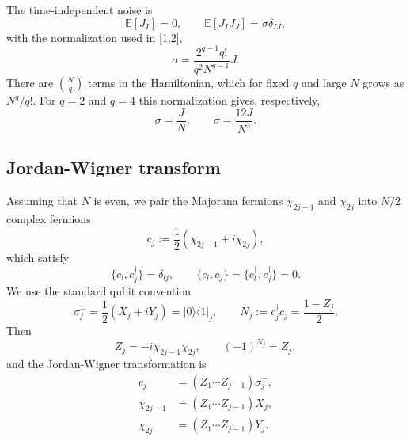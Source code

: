 \documentclass{article}
\theoremstyle{definition}
\begin{document}
The time-independent noise is
\begin{equation}
    \mathbb E[J_I]=0,
    \qquad
    \mathbb E[J_IJ_J]
    =
    \sigma\delta_{IJ},
\end{equation}
with the normalization used in [1,2],
\begin{equation}
    \sigma
    =
    \frac{2^{q-1}q!}{q^2N^{q-1}}J.
    \label{eq:SYK_sigma}
\end{equation}
There are $\binom Nq$ terms in the Hamiltonian, which for fixed $q$ and
large $N$ grows as $N^q/q!$.  For $q=2$ and $q=4$ this normalization
gives, respectively,
\begin{equation}
    \sigma=\frac{J}{N},
    \qquad
    \sigma=\frac{12J}{N^3}.
\end{equation}


\subsection{Jordan-Wigner transform}

Assuming that $N$ is even, we pair the Majorana fermions
$\chi_{2j-1}$ and $\chi_{2j}$ into $N/2$ complex fermions
\begin{equation}
    c_j
    :=
    \frac12
    \left(
       \chi_{2j-1}
       +
       i\chi_{2j}
    \right),
\end{equation}
which satisfy
\begin{equation}
    \{c_l,c_j^\dagger\}=\delta_{lj},
    \qquad
    \{c_l,c_j\}
    =
    \{c_l^\dagger,c_j^\dagger\}
    =
    0.
\end{equation}
We use the standard qubit convention
\begin{equation}
    \sigma_j^-
    =
    \frac12(X_j+iY_j)
    =
    |0\rangle\langle1|_j,
    \qquad
    N_j
    :=
    c_j^\dagger c_j
    =
    \frac{1-Z_j}{2}.
    \label{eq:SYK_qubit_convention}
\end{equation}
Then
\begin{equation}
    Z_j
    =
    -i\chi_{2j-1}\chi_{2j},
    \qquad
    (-1)^{N_j}=Z_j,
\end{equation}
and the Jordan-Wigner transformation is
\begin{align}
    c_j
    &=
    (Z_1\cdots Z_{j-1})\sigma_j^-,
    \nonumber\\
    \chi_{2j-1}
    &=
    (Z_1\cdots Z_{j-1})X_j,
    \nonumber\\
    \chi_{2j}
    &=
    (Z_1\cdots Z_{j-1})Y_j.
    \label{eq:SYK_JW}
\end{align}
\end{document}
